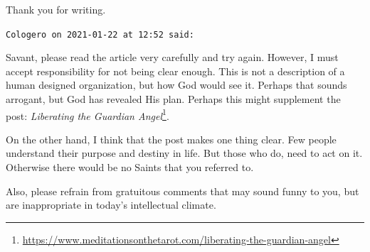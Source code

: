 \begin{footnotesize}
\begin{sffamily}
Thank you for writing.


\hfill

\texttt{Cologero on 2021-01-22 at 12:52 said: }

Savant, please read the article very carefully and try again. However, I must accept responsibility for not being clear enough. This is not a description of a human designed organization, but how God would see it. Perhaps that sounds arrogant, but God has revealed His plan. Perhaps this might supplement the post: \textit{Liberating the Guardian Angel}\footnote{\url{https://www.meditationsonthetarot.com/liberating-the-guardian-angel}}.

On the other hand, I think that the post makes one thing clear. Few people understand their purpose and destiny in life. But those who do, need to act on it. Otherwise there would be no Saints that you referred to.

Also, please refrain from gratuitous comments that may sound funny to you, but are inappropriate in today's intellectual climate.


\end{sffamily}\end{footnotesize}
